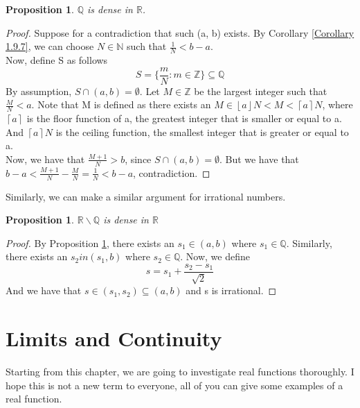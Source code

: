 \documentclass{book}
\newtheorem{proposition}[theorem]{Proposition}
\begin{document}
\begin{proposition} \label{Proposition 1.9.9}
    $\mathbb{Q}$ is dense in $\mathbb{R}$.
\end{proposition}

\begin{proof}
    Suppose for a contradiction that such (a, b) exists. By Corollary \ref{Corollary 1.9.7}, we can choose $N \in \mathbb{N}$ such that $\frac{1}{N} < b - a$. \\
    Now, define S as follows
    $$S = \{ \frac{m}{N} : m \in \mathbb{Z} \} \subseteq \mathbb{Q}$$
    By assumption, $S \cap (a, b) = \emptyset$. Let $M \in \mathbb{Z}$ be the largest integer such that $\frac{M}{N} < a$. Note that M is defined as there exists an $M \in \left \lfloor{a}\right \rfloor N < M < \left \lceil{a}\right \rceil N$, where $\left \lceil{a}\right \rceil$ is the floor function of a, the greatest integer that is smaller or equal to a. And $\left \lceil{a}\right \rceil N$ is the ceiling function, the smallest integer that is greater or equal to a. \\
    Now, we have that $\frac{M + 1}{N} > b$, since $S \cap (a, b) = \emptyset$. But we have that $b - a < \frac{M + 1}{N} - \frac{M}{N} = \frac{1}{N} < b - a$, contradiction.
\end{proof}

Similarly, we can make a similar argument for irrational numbers.

\begin{proposition}
    $\mathbb{R}\backslash\mathbb{Q}$ is dense in $\mathbb{R}$
\end{proposition}

\begin{proof}
    By Proposition \ref{Proposition 1.9.9}, there exists an $s_{1} \in (a, b)$ where $s_{1} \in \mathbb{Q}$. Similarly, 
    there exists an $s_{2} in (s_{1}, b)$ where $s_{2} \in \mathbb{Q}$. Now, we define 
    $$s = s_{1} + \frac{s_{2} - s_{1}}{\sqrt{2}}$$
    And we have that $s \in (s_{1}, s_{2}) \subseteq (a, b)$ and s is irrational.
\end{proof}

\chapter{Limits and Continuity}
Starting from this chapter, we are going to investigate real functions thoroughly. I hope this is not a new term to everyone, all of you can give some examples of a real function. 
\end{document}
